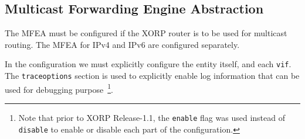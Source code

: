 \newpage
\subsection{Multicast Forwarding Engine Abstraction}
\label{sec:protocols:mfea}

The MFEA must be configured if the XORP router is to be used for multicast
routing. The MFEA for IPv4 and IPv6 are configured separately.

In the configuration we must explicitly configure the entity itself, and
each {\tt vif}. The {\tt traceoptions} section is used to explicitly enable
log information that can be used for debugging purpose~\footnote{Note that
prior to XORP Release-1.1, the {\tt enable} flag was used instead of
{\tt disable} to enable or disable each part of the configuration.}.


